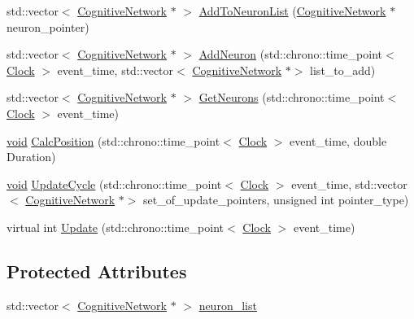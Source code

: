 \begin{DoxyCompactItemize}
\item 
std\+::vector$<$ \mbox{\hyperlink{class_cognitive_network}{Cognitive\+Network}} $\ast$ $>$ \mbox{\hyperlink{class_orbital_a44230cebc40357d186c442bfac2507a4}{Add\+To\+Neuron\+List}} (\mbox{\hyperlink{class_cognitive_network}{Cognitive\+Network}} $\ast$neuron\+\_\+pointer)
\item 
std\+::vector$<$ \mbox{\hyperlink{class_cognitive_network}{Cognitive\+Network}} $\ast$ $>$ \mbox{\hyperlink{class_orbital_a57480cdd63dd1bf731864f513767800d}{Add\+Neuron}} (std\+::chrono\+::time\+\_\+point$<$ \mbox{\hyperlink{universe_8h_a0ef8d951d1ca5ab3cfaf7ab4c7a6fd80}{Clock}} $>$ event\+\_\+time, std\+::vector$<$ \mbox{\hyperlink{class_cognitive_network}{Cognitive\+Network}} $\ast$$>$ list\+\_\+to\+\_\+add)
\item 
std\+::vector$<$ \mbox{\hyperlink{class_cognitive_network}{Cognitive\+Network}} $\ast$ $>$ \mbox{\hyperlink{class_orbital_a7d7e4b7cb0d009a5e7224b6f758d7b6b}{Get\+Neurons}} (std\+::chrono\+::time\+\_\+point$<$ \mbox{\hyperlink{universe_8h_a0ef8d951d1ca5ab3cfaf7ab4c7a6fd80}{Clock}} $>$ event\+\_\+time)
\item 
\mbox{\hyperlink{glad_8h_a950fc91edb4504f62f1c577bf4727c29}{void}} \mbox{\hyperlink{class_orbital_a5aa5edbae517ff393fc1eb0ae2422123}{Calc\+Position}} (std\+::chrono\+::time\+\_\+point$<$ \mbox{\hyperlink{universe_8h_a0ef8d951d1ca5ab3cfaf7ab4c7a6fd80}{Clock}} $>$ event\+\_\+time, double Duration)
\item 
\mbox{\hyperlink{glad_8h_a950fc91edb4504f62f1c577bf4727c29}{void}} \mbox{\hyperlink{class_orbital_afbf72ba4e260627422c9f53dea793923}{Update\+Cycle}} (std\+::chrono\+::time\+\_\+point$<$ \mbox{\hyperlink{universe_8h_a0ef8d951d1ca5ab3cfaf7ab4c7a6fd80}{Clock}} $>$ event\+\_\+time, std\+::vector$<$ \mbox{\hyperlink{class_cognitive_network}{Cognitive\+Network}} $\ast$$>$ set\+\_\+of\+\_\+update\+\_\+pointers, unsigned int pointer\+\_\+type)
\item 
virtual int \mbox{\hyperlink{class_orbital_a837289c3b2af844724c381707dee40d0}{Update}} (std\+::chrono\+::time\+\_\+point$<$ \mbox{\hyperlink{universe_8h_a0ef8d951d1ca5ab3cfaf7ab4c7a6fd80}{Clock}} $>$ event\+\_\+time)
\end{DoxyCompactItemize}
\subsection*{Protected Attributes}
\begin{DoxyCompactItemize}
\item 
std\+::vector$<$ \mbox{\hyperlink{class_cognitive_network}{Cognitive\+Network}} $\ast$ $>$ \mbox{\hyperlink{class_orbital_a504f1b3e8621e7eb7e682c3cec48272d}{neuron\+\_\+list}}
\end{DoxyCompactItemize}
